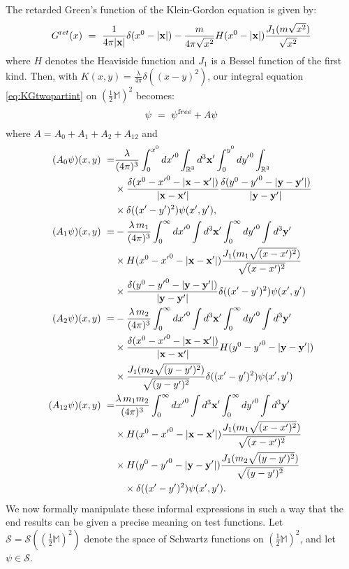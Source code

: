 \documentclass[b5paper,draft,openbib,12pt]{memoir}
\newcommand{\M}{\mathbb{M}}
\newcommand{\vx}{\mathbf{x}}
\newcommand{\vy}{\mathbf{y}}
\newcommand{\ret}{{\textup ret}}
\newcommand{\free}{{\textup free}}
\begin{document}
The retarded Green's function of the Klein-Gordon equation is given 
by:
\begin{equation}
	G^\ret(x) ~=~ \frac{1}{4\pi|\vx|}\delta(x^0-|\vx|) - \frac{m}{4\pi \sqrt{x^2}} H(x^0-|\vx|) \frac{J_1(m\sqrt{x^2})}{\sqrt{x^2}} 
	\label{eq:gretkg}
\end{equation}
where $H$ denotes the Heaviside function and $J_1$ is a
Bessel function of the first kind.
Then, with $K(x,y) = \frac{\lambda}{4\pi} \delta((x-y)^2)$, our 
integral equation \eqref{eq:KGtwopartint} on $(\tfrac{1}{2}\M)^2$ becomes:
\begin{equation}
	\psi ~=~ \psi^\free + A \psi
\label{eq:abstractinteq}
\end{equation}
where $A = A_0 + A_1 + A_2 + A_{12}$ and
\begin{align}
(A_0 \psi)(x,y) ~=& \frac{\lambda}{(4\pi)^3} \int_0^{x^0} d {x'}^0 \int_{\mathbb{R}^3} d^3 \vx' \int_0^{y^0} d{y'}^0 \int_{\mathbb{R}^3} \nonumber\\ 
  &\times \frac{\delta(x^0-{x'}^0-|\vx-\vx'|)}{|\vx-\vx'|}\frac{\delta(y^0-{y'}^0-|\vy-\vy'|)}{|\vy-\vy'|}\notag\\
  &\times\delta((x'-y')^2) \psi(x',y'),\label{eq:a0informal}\\
(A_1 \psi)(x,y) ~=&  -\frac{\lambda \, m_1}{(4 \pi)^3} \int_0^\infty d{x'}^0 \int d^3 \vx' \int_0^\infty d{y'}^0 \int d^3 \vy'  \nonumber\\
  &\times H(x^0-{x'}^0-|\vx-\vx'|)\frac{J_1(m_1\sqrt{(x-x')^2})}{\sqrt{(x-x')^2}} \notag \\
  &\times  \frac{\delta(y^0-{y'}^0-|\vy-\vy'|)}{|\vy-\vy'|}\delta((x'-y')^2) \psi(x',y')\label{eq:a1informal}\\
(A_2 \psi)(x,y) ~=& -\frac{\lambda \, m_2}{(4 \pi)^3} \int_0^\infty d{x'}^0 \int d^3 \vx' \int_0^\infty d{y'}^0 \int d^3 \vy' \nonumber\\
& \times \frac{\delta(x^0-{x'}^0-|\vx-\vx'|)}{|\vx-\vx'|}H(y^0-{y'}^0-|\vy-\vy'|) \notag\\
& \times \frac{J_1(m_2\sqrt{(y-y')^2})}{\sqrt{(y-y')^2}} \delta((x'-y')^2) \psi(x',y') \label{eq:a2informal}\\
(A_{12} \psi)(x,y) ~=& \frac{\lambda \, m_1 m_2}{(4\pi)^3}  \int_0^\infty d{x'}^0 \int d^3 \vx' \int_0^\infty d{y'}^0 \int d^3 \vy'  \nonumber\\
&\times H(x^0-{x'}^0-|\vx-\vx'|) \frac{J_1(m_1\sqrt{(x-x')^2})}{\sqrt{(x-x')^2}}  \nonumber\\
&\times H(y^0-{y'}^0-|\vy-\vy'|) \frac{J_1(m_2\sqrt{(y-y')^2})}{\sqrt{(y-y')^2}}\notag\\
&\quad \times\delta((x'-y')^2) \psi(x',y')\label{eq:a12informal}.
\end{align}
We now formally manipulate these informal expressions in such a way 
that the end results can be given a precise meaning on test 
functions. Let $\mathcal{S} = \mathcal{S}((\tfrac{1}{2}\M)^2)$ 
denote the space of Schwartz functions on $(\tfrac{1}{2}\M)^2$, 
and let $\psi \in \mathcal{S}$. 
\end{document}
